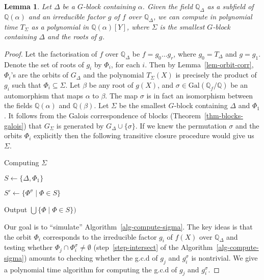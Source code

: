 \documentclass[11pt]{madras}%
\newtheorem{lemma}[theorem]{Lemma}
\theoremstyle{remark}
\newcommand{\Gal}[1]{{\ensuremath{\mathrm{Gal}\left(#1\right)}}}
\begin{document}
\begin{lemma}\label{lem-enlarge-block}
  Let $\Delta$ be a $G$-block containing $\alpha$. Given the field
  $\mathbb{Q}_\Delta$ as a subfield of $\mathbb{Q}(\alpha)$ and an
  irreducible factor $g$ of $f$ over $\mathbb{Q}_\Delta$, we can
  compute in polynomial time $T_\Sigma$ as a polynomial in
  $\mathbb{Q}(\alpha)[Y]$, where $\Sigma$ is the smallest $G$-block
  containing $\Delta$ and the roots of $g$.
\end{lemma}
\begin{proof}
  Let the factorisation of $f$ over $\mathbb{Q}_\Delta$ be $f=g_0
  \ldots g_r$, where $g_0 = T_\Delta$ and $g=g_1$.  Denote the set of
  roots of $g_i$ by $\Phi_i$, for each $i$. Then by
  Lemma~\ref{lem-orbit-corr}, $\Phi_i$'s are the orbits of $G_\Delta$
  and the polynomial $T_\Sigma(X)$ is precisely the product of $g_i$
  such that $\Phi_i \subseteq \Sigma$.  Let $\beta$ be any root of
  $g(X)$, and $\sigma \in \Gal{\mathbb{Q}_f/\mathbb{Q}}$ be an
  automorphism that maps $\alpha$ to $\beta$. The map $\sigma$ is
  in fact an isomorphism between the fields $\mathbb{Q}(\alpha)$ and
  $\mathbb{Q}(\beta)$.  Let $\Sigma$ be the smallest $G$-block
  containing $\Delta$ and $\Phi_1$.  It follows from the Galois
  correspondence of blocks (Theorem~\ref{thm-blocks-galois}) that
  $G_\Sigma$ is generated by $G_\Delta\cup\{\sigma\}$.  If we knew the
  permutation $\sigma$ and the orbits $\Phi_i$ explicitly then the
  following transitive closure procedure would give us $\Sigma$.

  \begin{algorithm}
    \caption{Computing $\Sigma$}\label{alg-compute-sigma}%
    $S \leftarrow \{\Delta,\Phi_1\}$

    { 

      $S' \leftarrow \{ \Phi^\sigma \mid \Phi \in S \}$
  
    }
    
    Output $\bigcup\{\Phi\mid \Phi\in S\})$
  \end{algorithm}
 
  Our goal is to ``simulate'' Algorithm~\ref{alg-compute-sigma}. The
  key ideas is that the orbit $\Phi_i$ corresponds to the irreducible
  factor $g_i$ of $f(X)$ over $\mathbb{Q}_\Delta$ and testing whether
  $\Phi_j\cap\Phi_i^\sigma\neq\emptyset$ (step~\ref{step-intersect} of
  the Algorithm~\ref{alg-compute-sigma}) amounts to checking whether
  the g.c.d of $g_j$ and $g_i^\sigma$ is nontrivial. We give a
  polynomial time algorithm for computing the g.c.d of $g_j$ and
  $g_i^\sigma$.


\end{proof}
\end{document}
